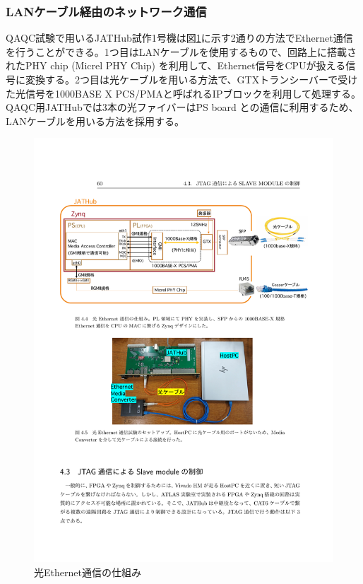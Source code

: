 \subsubsection{LANケーブル経由のネットワーク通信}
\label{subsubsec_network}
\baselineskip
QAQC試験で用いるJATHub試作1号機は図\ref{JATHub_ether}に示す2通りの方法でEthernet通信を行うことができる。1つ目はLANケーブルを使用するもので、回路上に搭載されたPHY chip (Micrel PHY Chip) を利用して、Ethernet信号をCPUが扱える信号に変換する。2つ目は光ケーブルを用いる方法で、GTXトランシーバーで受けた光信号を1000BASE X PCS/PMAと呼ばれるIPブロックを利用して処理する。QAQC用JATHubでは3本の光ファイバーはPS board との通信に利用するため、LANケーブルを用いる方法を採用する。

\begin{figure} 
\centering
\includegraphics[width=16cm]{fig/QAQC/JATHub_ether.pdf}
\caption[光Ethernet通信の仕組み]{光Ethernet通信の仕組み\cite{mt_atanaka}}
\label{JATHub_ether}
\end{figure}


